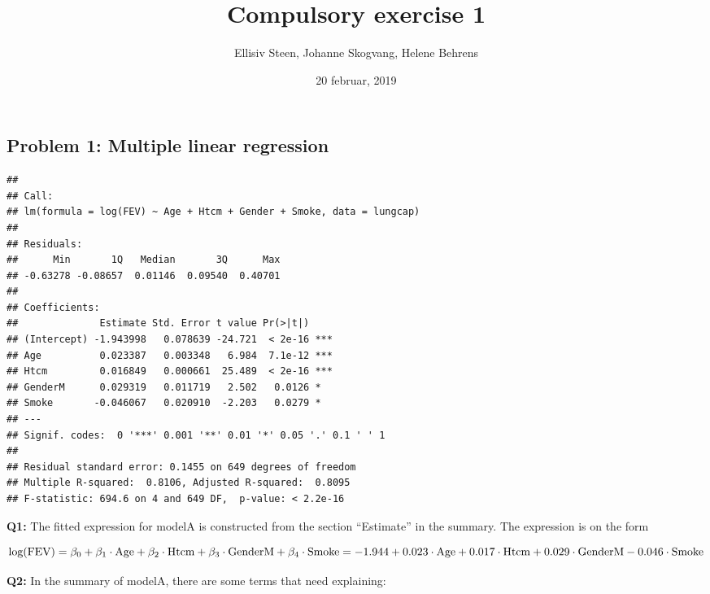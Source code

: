 \documentclass[]{article}
\title{Compulsory exercise 1}
\author{Ellisiv Steen, Johanne Skogvang, Helene Behrens}
\date{20 februar, 2019}
\begin{document}
\maketitle

\subsection{Problem 1: Multiple linear
regression}\label{problem-1-multiple-linear-regression}

\begin{verbatim}
## 
## Call:
## lm(formula = log(FEV) ~ Age + Htcm + Gender + Smoke, data = lungcap)
## 
## Residuals:
##      Min       1Q   Median       3Q      Max 
## -0.63278 -0.08657  0.01146  0.09540  0.40701 
## 
## Coefficients:
##              Estimate Std. Error t value Pr(>|t|)    
## (Intercept) -1.943998   0.078639 -24.721  < 2e-16 ***
## Age          0.023387   0.003348   6.984  7.1e-12 ***
## Htcm         0.016849   0.000661  25.489  < 2e-16 ***
## GenderM      0.029319   0.011719   2.502   0.0126 *  
## Smoke       -0.046067   0.020910  -2.203   0.0279 *  
## ---
## Signif. codes:  0 '***' 0.001 '**' 0.01 '*' 0.05 '.' 0.1 ' ' 1
## 
## Residual standard error: 0.1455 on 649 degrees of freedom
## Multiple R-squared:  0.8106, Adjusted R-squared:  0.8095 
## F-statistic: 694.6 on 4 and 649 DF,  p-value: < 2.2e-16
\end{verbatim}

\textbf{Q1:} The fitted expression for modelA is constructed from the
section ``Estimate'' in the summary. The expression is on the form

\[\textrm{log(FEV)} = \beta_0 + \beta_1 \cdot \textrm{Age} + \beta_2 \cdot \textrm{Htcm} + \beta_3 \cdot \textrm{GenderM} + \beta_4 \cdot \textrm{Smoke} \\
= -1.944 + 0.023\cdot \textrm{Age} + 0.017 \cdot \textrm{Htcm} + 0.029 \cdot \textrm{GenderM} - 0.046 \cdot \textrm{Smoke}\]

\textbf{Q2:} In the summary of modelA, there are some terms that need
explaining:
\end{document}
